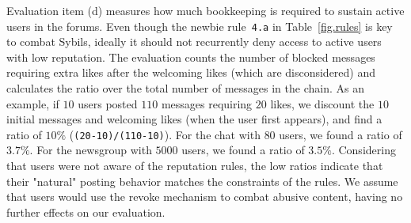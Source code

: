 \documentclass[12pt]{article}
\newcommand{\code}[1]  {\texttt{\footnotesize{#1}}}
\begin{document}
Evaluation item (d) measures how much bookkeeping is required to sustain active
users in the forums.
Even though the newbie rule~\code{4.a} in Table~\ref{fig.rules} is key to
combat Sybils, ideally it should not recurrently deny access to active users
with low reputation.
%
The evaluation counts the number of blocked messages requiring extra likes
after the welcoming likes (which are disconsidered) and calculates the ratio
over the total number of messages in the chain.
As an example, if $10$ users posted $110$ messages requiring $20$ likes, we
discount the $10$ initial messages and welcoming likes (when the user first
appears), and find a ratio of $10\%$ (\code{(20-10)/(110-10)}).
%
For the chat with $80$ users, we found a ratio of $3.7\%$.
For the newsgroup with $5000$ users, we found a ratio of $3.5\%$.
%
Considering that users were not aware of the reputation rules, the low ratios
indicate that their "natural" posting behavior matches the constraints of the
rules.
%
We assume that users would use the revoke mechanism to combat abusive content,
having no further effects on our evaluation.
\end{document}
